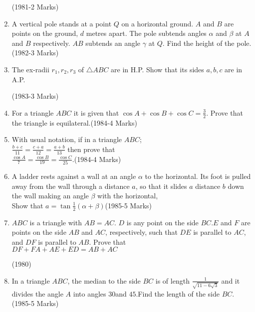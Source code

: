 \documentclass[journal,12pt,twocolumn]{IEEEtran}
\theoremstyle{remark}
\begin{document}
\begin{enumerate}
    \hfill(1981-2 Marks)
    \item A vertical pole stands at a point $Q$ on a horizontal ground. $A$ and $B$ are points on the ground, $d$ metres apart. The pole subtends angles $\alpha$ and $\beta$ at $A$ and $B$ respectively. $AB$ subtends an angle $\gamma$ at $Q$. Find the height of the pole.\hfill(1982-3 Marks)
    \item The ex-radii $r_1,r_2,r_3$ of $\triangle ABC$ are in H.P. Show that its sides $a,b,c$ are in A.P.

    \hfill(1983-3 Marks)
    \item For a triangle $ABC$ it is given that $\cos A+\cos B+\cos C=\frac{3}{2}$. Prove that the triangle is equilateral.\hfill(1984-4 Marks)
    \item With usual notation, if in a triangle $ABC$;\\
    $\frac{b+c}{11}=\frac{c+a}{12}=\frac{a+b}{13}$ then prove that\\
    $\frac{\cos A}{7}=\frac{\cos B}{19}=\frac{\cos C}{25}$.\hfill(1984-4 Marks)
    \item A ladder rests against a wall at an angle $\alpha$ to the horizontal. Its foot is pulled away from the wall through a distance $a$, so that it slides $a$ distance $b$ down the wall making an angle $\beta$ with the horizontal,\\
    Show that $a=\tan \frac{1}{2}(\alpha+\beta)$\hfill(1985-5 Marks)
    \item $ABC$ is a triangle with $AB=AC$. $D$ is any point on the side $BC. E$ and $F$ are points on the side $AB$ and $AC$, respectively, such that $DE$ is parallel to $AC$, and $DF$ is parallel to $AB$. Prove that\\
    $DF+FA+AE+ED=AB+AC$

    \hfill(1980)
    \item In a triangle $ABC$, the median to the side $BC$ is of length $\frac{1}{\sqrt{11-6\sqrt{3}}}$ and it divides the angle $A$ into angles $30$\textdegree and $45$\textdegree.Find the length of the side $BC$.\hfill(1985-5 Marks)
\end{enumerate} 
\end{document}
